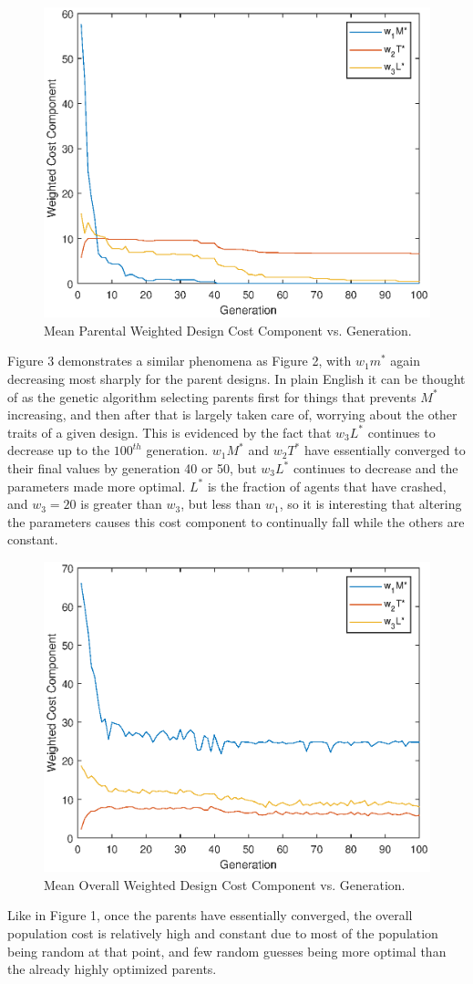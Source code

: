 \documentclass[a4paper,12pt]{report}
\begin{document}
\begin{figure}[H]
\begin{nscenter}
  \includegraphics[width=0.5\linewidth]{results2b.eps}
  \caption{Mean Parental Weighted Design Cost Component vs. Generation.}
    \end{nscenter}
\end{figure}
\noindent
Figure 3 demonstrates a similar phenomena as Figure 2, with $w_1m^*$ again decreasing most sharply for the parent designs. In plain English it can be thought of as the genetic algorithm selecting parents first for things that prevents $M^*$ increasing, and then after that is largely taken care of, worrying about the other traits of a given design. This is evidenced by the fact that $w_3L^*$ continues to decrease up to the $100^{th}$ generation. $w_1M^*$ and $w_2T^*$ have essentially converged to their final values by generation 40 or 50, but $w_3L^*$ continues to decrease and the parameters made more optimal. $L^*$ is the fraction of agents that have crashed, and $w_3 = 20$ is greater than $w_3$, but less than $w_1$, so it is interesting that altering the parameters causes this cost component to continually fall while the others are constant.
\begin{figure}[H]
\begin{nscenter}
  \includegraphics[width=0.5\linewidth]{results2c.eps}
  \caption{Mean Overall Weighted Design Cost Component vs. Generation.}
    \end{nscenter}
\end{figure}
\noindent
Like in Figure 1, once the parents have essentially converged, the overall population cost is relatively high and constant due to most of the population being random at that point, and few random guesses being more optimal than the already highly optimized parents.
\end{document}
